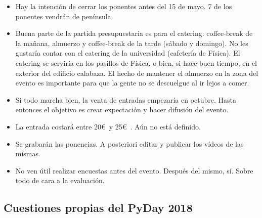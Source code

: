 \documentclass[a4paper, 12pt]{article}
\begin{document}
\begin{itemize}
    \item Hay la intención de cerrar los ponentes antes del 15 de mayo. 7 de los ponentes vendrán de península.
    \item Buena parte de la partida presupuestaria es para el catering: coffee-break de la mañana, almuerzo y coffee-break de la tarde (sábado y domingo). No les gustaría contar con el catering de la universidad (cafetería de Física). El catering se serviría en los pasillos de Física, o bien, si hace buen tiempo, en el exterior del edificio calabaza. El hecho de mantener el almuerzo en la zona del evento es importante para que la gente no se descuelgue al ir lejos a comer.
    \item Si todo marcha bien, la venta de entradas empezaría en octubre. Hasta entonces el objetivo es crear expectación y hacer difusión del evento.
    \item La entrada costará entre 20\euro\ y 25\euro\ . Aún no está definido.
    \item Se grabarán las ponencias. A posteriori editar y publicar los vídeos de las mismas.
    \item No ven útil realizar encuestas antes del evento. Después del mismo, sí. Sobre todo de cara a la evaluación.
\end{itemize}

\subsection*{Cuestiones propias del PyDay 2018}
\end{document}
